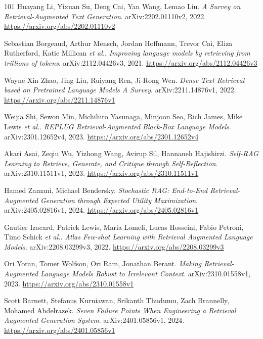 \documentclass[11pt,a4paper]{article}
\begin{document}
\begin{thebibliography}{101}
Huayang Li, Yixuan Su, Deng Cai, Yan Wang, Lemao Liu.
\newblock \emph{A Survey on Retrieval-Augmented Text Generation}.
\newblock arXiv:2202.01110v2, 2022.
\newblock \url{https://arxiv.org/abs/2202.01110v2}

Sebastian Borgeaud, Arthur Mensch, Jordan Hoffmann, Trevor Cai, Eliza Rutherford, Katie Millican \emph{et al.}.
\newblock \emph{Improving language models by retrieving from trillions of tokens}.
\newblock arXiv:2112.04426v3, 2021.
\newblock \url{https://arxiv.org/abs/2112.04426v3}

Wayne Xin Zhao, Jing Liu, Ruiyang Ren, Ji-Rong Wen.
\newblock \emph{Dense Text Retrieval based on Pretrained Language Models A Survey}.
\newblock arXiv:2211.14876v1, 2022.
\newblock \url{https://arxiv.org/abs/2211.14876v1}

Weijia Shi, Sewon Min, Michihiro Yasunaga, Minjoon Seo, Rich James, Mike Lewis \emph{et al.}.
\newblock \emph{REPLUG Retrieval-Augmented Black-Box Language Models}.
\newblock arXiv:2301.12652v4, 2023.
\newblock \url{https://arxiv.org/abs/2301.12652v4}

Akari Asai, Zeqiu Wu, Yizhong Wang, Avirup Sil, Hannaneh Hajishirzi.
\newblock \emph{Self-RAG Learning to Retrieve, Generate, and Critique through Self-Reflection}.
\newblock arXiv:2310.11511v1, 2023.
\newblock \url{https://arxiv.org/abs/2310.11511v1}

Hamed Zamani, Michael Bendersky.
\newblock \emph{Stochastic RAG: End-to-End Retrieval-Augmented Generation through Expected Utility Maximization}.
\newblock arXiv:2405.02816v1, 2024.
\newblock \url{https://arxiv.org/abs/2405.02816v1}

Gautier Izacard, Patrick Lewis, Maria Lomeli, Lucas Hosseini, Fabio Petroni, Timo Schick \emph{et al.}.
\newblock \emph{Atlas Few-shot Learning with Retrieval Augmented Language Models}.
\newblock arXiv:2208.03299v3, 2022.
\newblock \url{https://arxiv.org/abs/2208.03299v3}

Ori Yoran, Tomer Wolfson, Ori Ram, Jonathan Berant.
\newblock \emph{Making Retrieval-Augmented Language Models Robust to Irrelevant Context}.
\newblock arXiv:2310.01558v1, 2023.
\newblock \url{https://arxiv.org/abs/2310.01558v1}

Scott Barnett, Stefanus Kurniawan, Srikanth Thudumu, Zach Brannelly, Mohamed Abdelrazek.
\newblock \emph{Seven Failure Points When Engineering a Retrieval Augmented Generation System}.
\newblock arXiv:2401.05856v1, 2024.
\newblock \url{https://arxiv.org/abs/2401.05856v1}


\end{thebibliography}
\end{document}
